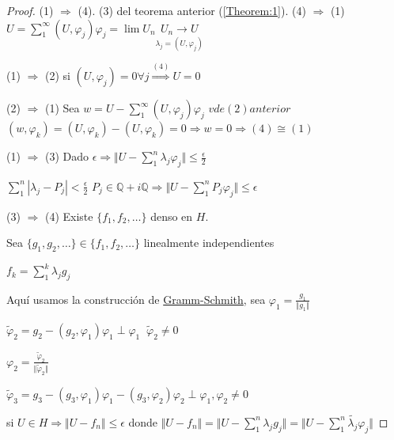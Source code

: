 \documentclass[a4paper,10pt]{book}
\def \ep{\epsilon}
\begin{document}
\begin{proof}
    (1) $\Rightarrow$ (4).  (3) del teorema anterior (\ref{Theorem:1}). (4) $\Rightarrow$ (1)  $ U= \sum\limits_1^\infty (U,\varphi_j)  \varphi_j =  \lim U_n   \underset{\lambda_j = (U,\varphi_j)}
    {U_n \rightarrow U }$

    (1) $\Rightarrow$ (2)  si $ (U,\varphi_j)=0 \forall j  \overset{(4)}{\Rightarrow} U=0$  
    
    (2) $\Rightarrow$ (1) Sea $w=U - \sum\limits_1^\infty (U,\varphi_j)\varphi_j$ $v de (2) anterior$
    $(w,\varphi_k)= (U,\varphi_k) -(U,\varphi_k) =0  \Rightarrow w= 0 \Rightarrow (4)\cong (1) $

    (1) $\Rightarrow$ (3) Dado $\epsilon \Rightarrow \Vert U - \sum\limits_1^n \lambda_j \varphi_j \Vert \leq \frac{\epsilon}{2} $

    $\sum\limits_1^n| \lambda_j - P_j| < \frac{\epsilon}{2}$ $P_j \in \mathbb{Q} + i \mathbb{Q} \Rightarrow \Vert U - \sum\limits_1^n P_j \varphi_j \Vert \leq \epsilon$

    (3) $\Rightarrow$ (4) Existe $\{ f_1,f_2,\ldots\}$ denso en $H$.

    Sea $\{g_1,g_2, \ldots\}\in \{ f_1,f_2,\ldots\}$ linealmente independientes

    $f_k = \sum\limits_1^k \lambda_j g_j$

    Aquí usamos la construcción de \underline{Gramm-Schmith}, sea $\varphi_1= \frac{g_1}{\Vert g_1\Vert}$

    $\tilde{\varphi}_2 = g_2 - (g_2,\varphi_1) \varphi_1 \perp \varphi_1 \;\; \tilde{\varphi}_2\neq 0$  

    $\varphi_2=\frac{\tilde{\varphi}_2}{\Vert \tilde{\varphi}_2\Vert}$

    $\tilde{\varphi}_3= g_3 -(g_3,\varphi_1) \varphi_1 - (g_3,\varphi_2)\varphi_2 \perp \varphi_1,\varphi_2 \neq 0$

    si $U\in H \Rightarrow \Vert U - f_n \Vert \leq \ep $  donde  $ \Vert U - f_n \Vert = \Vert U - \sum\limits_1^n \lambda_j g_j \Vert = \Vert U -\sum\limits_1^n \tilde{\lambda_j} \varphi_j \Vert$ 
\end{proof}
\end{document}
